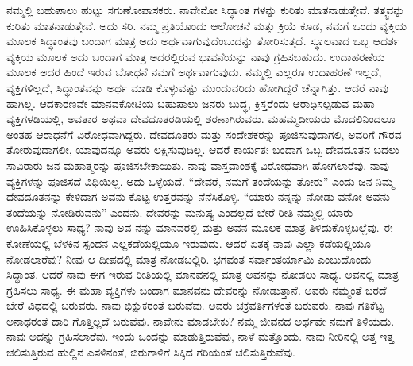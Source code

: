 ನಮ್ಮಲ್ಲಿ ಬಹುಪಾಲು ಹುಟ್ಟು ಸಗುಣೋಪಾಸಕರು. ನಾವೇನೋ ಸಿದ್ಧಾಂತ ಗಳನ್ನು ಕುರಿತು ಮಾತನಾಡುತ್ತೇವೆ. ತತ್ತ್ವವನ್ನು ಕುರಿತು ಮಾತನಾಡುತ್ತೇವೆ. ಅದು ಸರಿ. ನಮ್ಮ ಪ್ರತಿಯೊಂದು ಆಲೋಚನೆ ಮತ್ತು ಕ್ರಿಯೆ ಕೂಡ, ನಮಗೆ ಒಂದು ವ್ಯಕ್ತಿಯ ಮೂಲಕ ಸಿದ್ಧಾಂತವು ಬಂದಾಗ ಮಾತ್ರ ಅದು ಅರ್ಥವಾಗುವುದೆಂಬುದನ್ನು ತೋರಿಸುತ್ತದೆ. ಸ್ಥೂಲವಾದ ಒಬ್ಬ ಆದರ್ಶ ವ್ಯಕ್ತಿಯ ಮೂಲಕ ಅದು ಬಂದಾಗ ಮಾತ್ರ ಅದರಲ್ಲಿರುವ ಭಾವನೆಯನ್ನು ನಾವು ಗ್ರಹಿಸಬಹುದು. ಉದಾಹರಣೆಯ ಮೂಲಕ ಅದರ ಹಿಂದೆ ಇರುವ ಬೋಧನೆ ನಮಗೆ ಅರ್ಥವಾಗುವುದು. ನಮ್ಮಲ್ಲಿ ಎಲ್ಲರೂ ಉದಾಹರಣೆ ಇಲ್ಲದೆ, ವ್ಯಕ್ತಿಗಳಿಲ್ಲದೆ, ಸಿದ್ಧಾಂತವನ್ನು ಅರ್ಥ ಮಾಡಿ ಕೊಳ್ಳುವಷ್ಟು ಮುಂದುವರಿದು ಹೋಗಿದ್ದರೆ ಚೆನ್ನಾಗಿತ್ತು. ಆದರೆ ನಾವು ಹಾಗಿಲ್ಲ. ಆದಕಾರಣವೇ ಮಾನವಕೋಟಿಯ ಬಹುಪಾಲು ಜನರು ಬುದ್ಧ, ಕ್ರಿಸ್ತರೆಂದು ಆರಾಧಿಸಲ್ಪಡುವ ಮಹಾ ವ್ಯಕ್ತಿಗಳಡಿಯಲ್ಲಿ, ಅವತಾರ ಅಥವಾ ದೇವದೂತರಡಿಯಲ್ಲಿ ಶರಣಾಗಿರುವರು. ಮಹಮ್ಮದೀಯರು ಮೊದಲಿನಿಂದಲೂ ಅಂತಹ ಆರಾಧನೆಗೆ ವಿರೋಧವಾಗಿದ್ದರು. ದೇವದೂತರು ಮತ್ತು ಸಂದೇಶಕರನ್ನು ಪೂಜಿಸುವುದಾಗಲಿ, ಅವರಿಗೆ ಗೌರವ ತೋರುವುದಾಗಲೀ, ಯಾವುದನ್ನೂ ಅವರು ಲಕ್ಷಿಸುವುದಿಲ್ಲ. ಆದರೆ ಕಾರ್ಯತಃ ಬಂದಾಗ ಒಬ್ಬ ದೇವದೂತನ ಬದಲು ಸಾವಿರಾರು ಜನ ಮಹಾತ್ಮರನ್ನು ಪೂಜಿಸಬೇಕಾಯಿತು. ನಾವು ವಾಸ್ತವಾಂಶಕ್ಕೆ ವಿರೋಧವಾಗಿ ಹೋಗಲಾರೆವು. ನಾವು ವ್ಯಕ್ತಿಗಳನ್ನು ಪೂಜಿಸದೆ ವಿಧಿಯಿಲ್ಲ. ಅದು ಒಳ್ಳೆಯದೆ. “ದೇವರೆ, ನಮಗೆ ತಂದೆಯನ್ನು ತೋರು” ಎಂದು ಜನ ನಿಮ್ಮ ದೇವದೂತನನ್ನು ಕೇಳಿದಾಗ ಅವನು ಕೊಟ್ಟ ಉತ್ತರವನ್ನು ನೆನೆಸಿಕೊಳ್ಳಿ. “ಯಾರು ನನ್ನನ್ನು ನೋಡು ವನೋ ಅವನು ತಂದೆಯನ್ನು ನೋಡಿರುವನು” ಎಂದನು. ದೇವರನ್ನು ಮನುಷ್ಯ ಎಂದಲ್ಲದೆ ಬೇರೆ ರೀತಿ ನಮ್ಮಲ್ಲಿ ಯಾರು ಊಹಿಸಿಕೊಳ್ಳಲು ಸಾಧ್ಯ? ನಾವು ಅವ ನನ್ನು ಮಾನವರಲ್ಲಿ ಮತ್ತು ಅವನ ಮೂಲಕ ಮಾತ್ರ ತಿಳಿದುಕೊಳ್ಳಬಲ್ಲೆವು. ಈ ಕೋಣೆಯಲ್ಲಿ ಬೆಳಕಿನ ಸ್ಪಂದನ ಎಲ್ಲಕಡೆಯಲ್ಲಿಯೂ ಇರುವುದು. ಆದರೆ ಏತಕ್ಕೆ ನಾವು ಎಲ್ಲಾ ಕಡೆಯಲ್ಲಿಯೂ ನೋಡಲಾರೆವು? ನೀವು ಆ ದೀಪದಲ್ಲಿ ಮಾತ್ರ ನೋಡಬಲ್ಲಿರಿ. ಭಗವಂತ ಸರ್ವಾಂತರ್ಯಾಮಿ ಎಂಬುದೊಂದು ಸಿದ್ಧಾಂತ. ಆದರೆ ನಾವು ಈಗ ಇರುವ ರೀತಿಯಲ್ಲಿ ಮಾನವನಲ್ಲಿ ಮಾತ್ರ ಅವನನ್ನು ನೋಡಲು ಸಾಧ್ಯ. ಅವನಲ್ಲಿ ಮಾತ್ರ ಗ್ರಹಿಸಲು ಸಾಧ್ಯ. ಈ ಮಹಾ ವ್ಯಕ್ತಿಗಳು ಬಂದಾಗ ಮಾನವನು ದೇವರನ್ನು ನೋಡುತ್ತಾನೆ. ಅವರು ನಮ್ಮಂತೆ ಬರದೆ ಬೇರೆ ವಿಧದಲ್ಲಿ ಬರುವರು. ನಾವು ಭಿಕ್ಷುಕರಂತೆ ಬರುವೆವು. ಅವರು ಚಕ್ರವರ್ತಿಗಳಂತೆ ಬರುವರು. ನಾವು ಗತಿಕೆಟ್ಟ ಅನಾಥರಂತೆ ದಾರಿ ಗೊತ್ತಿಲ್ಲದೆ ಬರುವೆವು. ನಾವೇನು ಮಾಡಬೇಕು? ನಮ್ಮ ಜೀವನದ ಅರ್ಥವೇ ನಮಗೆ ತಿಳಿಯದು. ನಾವು ಅದನ್ನು ಗ್ರಹಿಸಲಾರೆವು. ಇಂದು ಒಂದನ್ನು ಮಾಡುತ್ತಿರುವೆವು, ನಾಳೆ ಮತ್ತೊಂದು. ನಾವು ನೀರಿನಲ್ಲಿ ಅತ್ತ ಇತ್ತ ಚಲಿಸುತ್ತಿರುವ ಹುಲ್ಲಿನ ಎಸಳಿನಂತೆ, ಬಿರುಗಾಳಿಗೆ ಸಿಕ್ಕಿದ ಗರಿಯಂತೆ ಚಲಿಸುತ್ತಿರುವೆವು.

